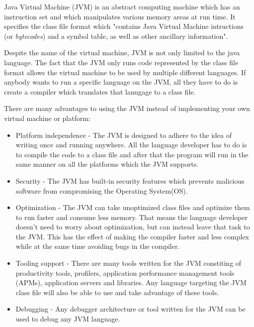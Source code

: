 \documentclass[..thesis.tex]{subfiles}
\begin{document}

Java Virtual Machine (JVM) is an abstract computing machine which has an instruction set and which manipulates various memory areas at run time.\cite{oracle_jvm_spec}
It specifies the class file format which "contains Java Virtual Machine intructions (or \textit{bytecodes}) and a symbol table, as well as other ancillary information"\cite{oracle_jvm_spec}.

Despite the name of the virtual machine, JVM is not only limited to the java language. 
The fact that the JVM only runs code represented by the class file format allows the virtual machine to be used by multiple different languages.
If anybody wants to run a specific language on the JVM, all they have to do is create a compiler which translates that lanugage to a class file.

There are many advantages to using the JVM instead of implementing your own virtual machine or platform:

\begin{itemize}
  \item Platform independence - 
    The JVM is designed to adhere to the idea of writing once and running anywhere. 
    All the language developer has to do is to compile the code to a class file and after that the program will run in the same manner on all the platforms which the JVM supports.
  \item Security - 
    The JVM has built-in security features which prevents malicious software from compromising the Operating System(OS). 
  \item Optimization - 
    The JVM can take unoptimized class files and optimize them to run faster and consume less memory. 
    That means the language developer doesn't need to worry about optimization, but can instead leave that task to the JVM.
    This has the effect of making the compiler faster and less complex while at the same time avoiding bugs in the compiler.
  \item Tooling support -
    There are many tools written for the JVM constiting of productivity tools, profilers, application performance management tools (APMs), application servers and libraries. 
    Any language targeting the JVM class file will also be able to use and take advantage of these tools.
  \item Debugging - 
    Any debugger architecture or tool written for the JVM can be used to debug any JVM language.
\end{itemize}
\end{document}
